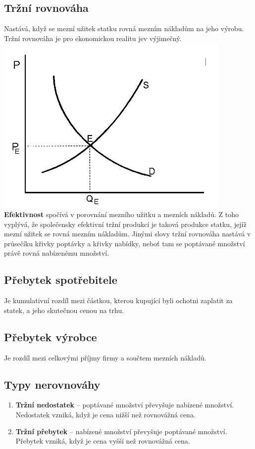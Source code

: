 \subsection{Tržní rovnováha}
Nastává, když se mezní užitek statku rovná mezním nákladům na jeho výrobu. 
Tržní rovnováha je pro ekonomickou realitu jev výjimečný.\\
\includegraphics{images/11_trzni_rovnovaha.png}\\
\textbf{Efektivnost} spočívá v porovnání mezního užitku a mezních nákladů. Z toho vyplývá,
že společensky efektivní tržní produkcí je taková produkce statku, jejíž mezní užitek se rovná mezním
nákladům. Jinými slovy tržní rovnováha nastává v průsečíku křivky poptávky a křivky nabídky, neboť
tam se poptávané množství právě rovná nabízenému množství.

\subsection{Přebytek spotřebitele}
Je kumulativní rozdíl mezi částkou, kterou kupující byli ochotni zaplatit
za statek, a jeho skutečnou cenou na trhu.

\subsection{Přebytek výrobce}
Je rozdíl mezi celkovými příjmy firmy a součtem mezních nákladů.

\subsection{Typy nerovnováhy}
\begin{enumerate}
    \item \textbf{Tržní nedostatek} – poptávané množství převyšuje nabízené množství.
    Nedostatek vzniká, když je cena nižší než rovnovážná cena.
    \item \textbf{Tržní přebytek} – nabízené množství převyšuje poptávané množství. 
    Přebytek vzniká, když je cena vyšší než rovnovážná cena.
\end{enumerate}